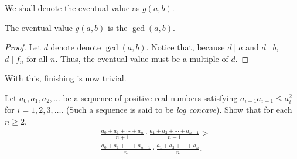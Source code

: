 \documentclass[a4paper, 10pt]{article}
\begin{document}
\begin{solution}
    We shall denote the eventual value as \( g(a, b) \).
    \begin{claim}
        The eventual value \( g(a, b) \) is the \( \gcd{(a, b)} \).
    \end{claim}
    \begin{proof}
        Let \( d \) denote denote \( \gcd{(a, b)} \). Notice that, because \( d
        \mid a \) and \( d \mid b \), \( d \mid f_n \) for all \( n \). Thus,
        the eventual value must be a multiple of \( d \).
    \end{proof}
    With this, finishing is now trivial.
\end{solution}

\begin{chirpbox}
\begin{problemnum}
    Let \( a_0, a_1, a_2, \ldots \) be a sequence of positive real numbers satisfying \( a_{i-1} a_{i+1} \le a_i^2 \) for \( i = 1, 2, 3, \ldots \). (Such a sequence is said to be \textit{log concave}). Show that for each \( n \ge 2 \),
    \begin{align*}
        &\frac{a_0 + a_1 + \cdots + a_n}{n+1} \cdot \frac{a_1 + a_2 + \cdots + a_{n-1}}{n-1} \ge \\
        &\frac{a_0 + a_1 + \cdots + a_{n-1}}{n} \cdot \frac{a_1 + a_2 + \cdots + a_n}{n}
    .\end{align*}
\end{problemnum}
\end{chirpbox}
\end{document}
